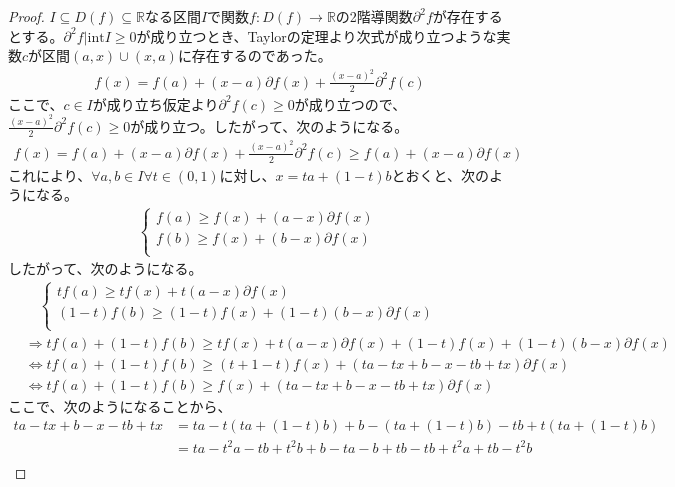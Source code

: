 \documentclass[dvipdfmx]{jsarticle}
\begin{document}
\begin{proof}
$I \subseteq D(f) \subseteq \mathbb{R}$なる区間$I$で関数$f:D(f) \rightarrow \mathbb{R}$の2階導関数$\partial^{2}f$が存在するとする。$\partial^{2}f|\mathrm{int}I \geq 0$が成り立つとき、Taylorの定理より次式が成り立つような実数$c$が区間$(a,x) \cup (x,a)$に存在するのであった。
\begin{align*}
f(x) = f(a) + (x - a)\partial f(x) + \frac{(x - a)^{2}}{2}\partial^{2}f(c)
\end{align*}
ここで、$c \in I$が成り立ち仮定より$\partial^{2}f(c) \geq 0$が成り立つので、$\frac{(x - a)^{2}}{2}\partial^{2}f(c) \geq 0$が成り立つ。したがって、次のようになる。
\begin{align*}
f(x) = f(a) + (x - a)\partial f(x) + \frac{(x - a)^{2}}{2}\partial^{2}f(c) \geq f(a) + (x - a)\partial f(x)
\end{align*}
これにより、$\forall a,b \in I\forall t \in (0,1)$に対し、$x = ta + (1 - t)b$とおくと、次のようになる。
\begin{align*}
\left\{ \begin{matrix}
f(a) \geq f(x) + (a - x)\partial f(x) \\
f(b) \geq f(x) + (b - x)\partial f(x) \\
\end{matrix} \right.\ 
\end{align*}
したがって、次のようになる。
\begin{align*}
&\quad \left\{ \begin{matrix}
tf(a) \geq tf(x) + t(a - x)\partial f(x) \\
(1 - t)f(b) \geq (1 - t)f(x) + (1 - t)(b - x)\partial f(x) \\
\end{matrix} \right.\ \\
&\Rightarrow tf(a) + (1 - t)f(b) \geq tf(x) + t(a - x)\partial f(x) + (1 - t)f(x) + (1 - t)(b - x)\partial f(x)\\
&\Leftrightarrow tf(a) + (1 - t)f(b) \geq (t + 1 - t)f(x) + (ta - tx + b - x - tb + tx)\partial f(x)\\
&\Leftrightarrow tf(a) + (1 - t)f(b) \geq f(x) + (ta - tx + b - x - tb + tx)\partial f(x)
\end{align*}
ここで、次のようになることから、
\begin{align*}
ta - tx + b - x - tb + tx &= ta - t\left( ta + (1 - t)b \right) + b - \left( ta + (1 - t)b \right) - tb + t\left( ta + (1 - t)b \right)\\
&= ta - t^{2}a - tb + t^{2}b + b - ta - b + tb - tb + t^{2}a + tb - t^{2}b\\

\end{align*}
\end{proof}
\end{document}
